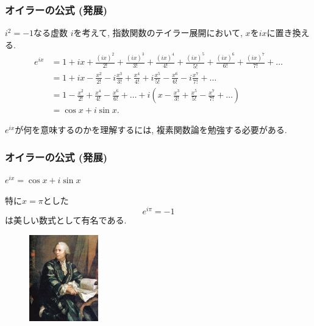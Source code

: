
\begin{frame}
\frametitle{オイラーの公式 (発展)}

$i^2=-1$なる虚数 $i$を考えて, 指数関数のテイラー展開において, $x$を$ix$に置き換える. 
\begin{align*}
e^{ix} & = 1+ix+\frac{(ix)^2}{2!}+\frac{(ix)^3}{3!}+\frac{(ix)^4}{4!}+\frac{(ix)^5}{5!}+\frac{(ix)^6}{6!}+\frac{(ix)^7}{7!}+\dots \\
& = 1+ix-\frac{x^2}{2!}-i\frac{x^3}{3!}+\frac{x^4}{4!}+i\frac{x^5}{5!}-\frac{x^6}{6!}-i\frac{x^7}{7!}+\dots \\
& = 1  -\frac{x^2}{2!}  +\frac{x^4}{4!}  -\frac{x^6}{6!} +\dots + i(x  -\frac{x^3}{3!}  +\frac{x^5}{5!} -\frac{x^7}{7!} + \dots ) \\
& = \cos x + i \sin x. 
\end{align*}

$e^{ix}$が何を意味するのかを理解するには, 複素関数論を勉強する必要がある. 

\end{frame}





\begin{frame}
\frametitle{オイラーの公式 (発展)}

\begin{Thm}[オイラーの公式]
\begin{center}
$
e^{ix} = \cos x + i \sin x
$
\end{center}
\end{Thm}

特に$x=\pi$とした
$$
e^{i \pi }=-1
$$
は美しい数式として有名である. 


 \begin{figure}[htbp]
 \begin{center} 
  \includegraphics[width=30mm, bb=0 0 614 767]{calculus9/Euler.jpg}
 \end{center}
\end{figure}

\end{frame}



